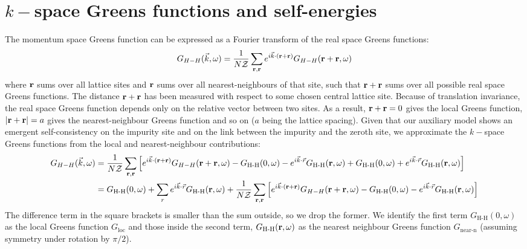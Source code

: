 \documentclass[reprint,hidelinks]{revtex4-2}
\begin{document}
\section{\(k-\)space Greens functions and self-energies}

The momentum space Greens function can be expressed as a Fourier transform of the real space Greens functions:
\begin{equation}\begin{aligned}
	G_{H-H} (\vec k, \omega) = \frac{1}{N \mathcal{Z}}\sum_{{\bf r}, {\bf r}}e^{i \vec{k}\cdot\left({\bf r} + {\bf r}\right)}G_{H-H} ({\bf r} + {\bf r}, \omega)
\end{aligned}\end{equation}
where ${\bf r}$ sums over all lattice sites and \({\bf r}\) sums over all nearest-neighbours of that site, such that \({\bf r} + {\bf r}\) sums over all possible real space Greens functions. The distance \({\bf r} + {\bf r}\) has been measured with respect to some chosen central lattice site. Because of translation invariance, the real space Greens function depends only on the relative vector between two sites. As a result, ${\bf r} + {\bf r} = 0$ gives the local Greens function, $|{\bf r} + {\bf r}|=a$ gives the nearest-neighbour Greens function and so on ($a$ being the lattice spacing). Given that our auxiliary model shows an emergent self-consistency on the impurity site and on the link between the impurity and the zeroth site, we approximate the \(k-\)space Greens functions from the local and nearest-neighbour contributions:
\begin{equation}\begin{aligned}
	G_{H-H} (\vec k, \omega) &= \frac{1}{N \mathcal{Z}}\sum_{{\bf r}, {\bf r}}\left[e^{i \vec{k}\cdot\left({\bf r} + {\bf r}\right)}G_{H-H} ({\bf r} + {\bf r}, \omega) - G_\text{H-H}(0,\omega) - e^{i\vec{k}\cdot\vec{r}}G_\text{H-H}({\bf r},\omega) + G_\text{H-H}(0,\omega) + e^{i\vec{k}\cdot\vec{r}}G_\text{H-H}({\bf r},\omega)\right]\\
				 &= G_\text{H-H}(0,\omega) + \sum_r e^{i\vec{k}\cdot\vec{r}}G_\text{H-H}({\bf r},\omega) + \frac{1}{N \mathcal{Z}}\sum_{{\bf r}, {\bf r}}\left[e^{i \vec{k}\cdot\left({\bf r} + {\bf r}\right)}G_{H-H} ({\bf r} + {\bf r}, \omega) - G_\text{H-H}(0,\omega) - e^{i\vec{k}\cdot\vec{r}}G_\text{H-H}({\bf r},\omega)\right]
\label{auxGreen}
\end{aligned}\end{equation}
The difference term in the square brackets is smaller than the sum outside, so we drop the former. We identify the first term \(G_\text{H-H}(0,\omega)\) as the local Greens function \(G_\text{loc}\) and those inside the second term, \(G_\text{H-H}({\bf r}, \omega)\) as the nearest neighbour Greens function \(G_\text{near-n}\) (assuming symmetry under rotation by \(\pi/2\)).
\end{document}
